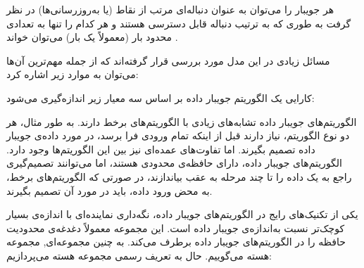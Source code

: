 هر جویبار را می‌توان به عنوان دنباله‌ای مرتب از نقاط (یا به‌روزرسانی‌ها) در نظر گرفت به طوری که به ترتیب دنباله قابل دسترسی هستند و هر کدام را تنها به تعدادی محدود بار (معمولاً یک بار) می‌توان خواند .

مسائل زیادی در این مدل مورد بررسی قرار گرفته‌اند که از جمله مهم‌ترین آن‌ها می‌توان به موارد زیر اشاره کرد:






کارایی یک الگوریتم جویبار داده بر اساس سه معیار زیر اندازه‌گیری می‌شود:






الگوریتم‌های جویبار داده تشابه‌های زیادی با الگوریتم‌های برخط دارند. به طور مثال، هر دو نوع الگوریتم، نیاز دارند قبل از اینکه تمام ورودی فرا برسد، در مورد داده‌ی جویبار داده تصمیم بگیرند.
اما تفاوت‌های عمده‌ای نیز بین این الگوریتم‌ها وجود دارد.
الگوریتم‌های جویبار داده، دارای حافظه‌ی محدودی هستند، اما می‌توانند تصمیم‌گیری راجع به یک داده را تا چند مرحله به عقب بیاندازند، در صورتی که الگوریتم‌های برخط، به محض ورود داده، باید در مورد آن تصمیم بگیرند.



یکی از تکنیک‌های رایج در الگوریتم‌های جویبار داده، نگه‌داری نماینده‌ای با اندازه‌ی بسیار کوچک‌تر نسبت به‌اندازه‌ی جویبار داده است.
این مجموعه معمولاً دغدغه‌ی محدودیت حافظه را در الگوریتم‌های جویبار داده برطرف می‌کند. به چنین مجموعه‌ای, مجموعه هسته می‌گوییم.
حال به تعریف رسمی مجموعه هسته می‌پردازیم:


